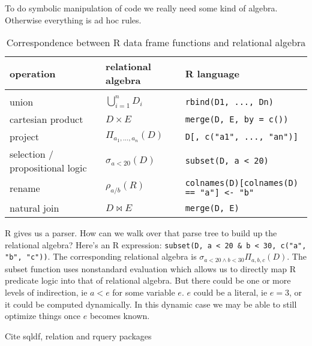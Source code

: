 \documentclass[12pt]{article}
\begin{document}
To do symbolic manipulation of code we really need some kind of algebra.
Otherwise everything is ad hoc rules.



\begin{table}[]
\centering
    \caption{Correspondence between R data frame functions and relational
    algebra}
\label{tab-correspond}
\begin{tabular}{lll}
    \textbf{operation} & \textbf{relational algebra} & \textbf{R language}
    \\
\hline
    \\ union  & $\bigcup_{i=1}^n D_i$
        & \texttt{rbind(D1, ..., Dn)}
    \\ cartesian product   & $D \times E$
        & \texttt{merge(D, E, by = c())}
    \\ project & $\Pi _{a_{1},\ldots ,a_{n}}(D)$
        & \texttt{D[, c("a1", ..., "an")]}
    \\ selection / propositional logic & $\sigma_{a < 20} (D)$
        & \texttt{subset(D, a < 20)}
    \\ rename & $\rho_{a / b}(R)$
        & \texttt{colnames(D)[colnames(D) == "a"] <- "b"}
    \\ natural join & $D \Join E$
        & \texttt{merge(D, E)}
\end{tabular}
\end{table}

R gives us a parser. How can we walk over that parse tree to build up the
relational algebra? Here's an R expression: 
\verb$subset(D, a < 20 & b < 30, c("a", "b", "c"))$.
The corresponding relational algebra is $\sigma_{a < 20 \wedge b < 30} \Pi _{a,
b, c} (D)$. The subset function uses nonstandard evaluation which allows us
to directly map R predicate logic into that of relational algebra. But
there could be one or more levels of indirection, ie $a < e$ for some
variable $e$. $e$ could be a literal, ie $e = 3$, or it could be computed
dynamically. In this dynamic case we may be able to still optimize things
once $e$ becomes known.

Cite sqldf, relation and rquery packages
\end{document}

